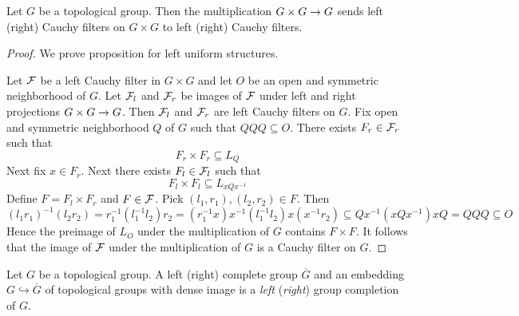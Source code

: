 \documentclass[10pt]{amsart}
\begin{document}
\begin{proposition}\label{proposition:multiplication_preserves_one_sided_Cauchy_filters}
	Let $G$ be a topological group. Then the multiplication $G\times G\rightarrow G$ sends left (right) Cauchy filters on $G\times G$ to left (right) Cauchy filters.
\end{proposition}
\begin{proof}
	We prove proposition for left uniform structures.

	Let ${\mathcal F}$ be a left Cauchy filter in $G\times G$ and let $O$ be an open and symmetric neighborhood of $G$. Let ${\mathcal F}_l$ and ${\mathcal F}_r$ be images of ${\mathcal F}$ under left and right projections $G\times G\rightarrow G$. Then ${\mathcal F}_l$ and ${\mathcal F}_r$ are left Cauchy filters on $G$. Fix open and symmetric neighborhood $Q$ of $G$ such that $QQQ \subseteq O$. There exists $F_r \in {\mathcal F}_r$ such that
	$$F_r \times F_r \subseteq L_Q$$
	Next fix $x \in F_r$. Next there exists $F_l \in {\mathcal F}_l$ such that
	$$F_l\times F_l \subseteq L_{xQx^{-1}}$$
	Define $F = F_l\times F_r$ and $F \in {\mathcal F}$. Pick $(l_1,r_1),(l_2,r_2) \in F$. Then
	$$(l_1r_1)^{-1}(l_2r_2) = r_1^{-1}(l_1^{-1}l_2)r_2 = (r_1^{-1}x)x^{-1}(l_1^{-1}l_2)x(x^{-1}r_2) \subseteq Qx^{-1}\left(xQx^{-1}\right)xQ = QQQ \subseteq O$$
	Hence the preimage of $L_O$ under the multiplication of $G$ contains $F \times F$. It follows that the image of ${\mathcal F}$ under the multiplication of $G$ is a Cauchy filter on $G$.
\end{proof}

\begin{definition}
	Let $G$ be a topological group. A left (right) complete group $\overline{G}$ and an embedding $G \hookrightarrow \overline{G}$ of topological groups with dense image is a \textit{left} (\textit{right}) group completion of $G$.
\end{definition}
\end{document}
